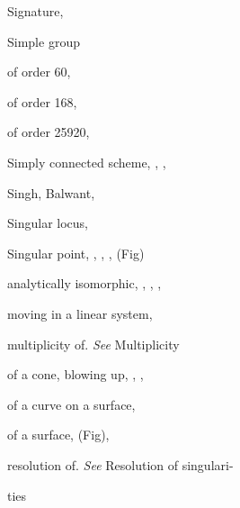 {{\noindent\hspace*{0.0bp}Signature, \par
\noindent\hspace*{0.0bp}Simple group\par
\noindent\hspace*{7.5bp}of order 60, \par
\noindent\hspace*{7.5bp}of order 168, \par
\noindent\hspace*{7.5bp}of order 25920, \par
\noindent\hspace*{0.0bp}Simply connected scheme, , , \par
\noindent\hspace*{0.0bp}Singh, Balwant, \par
\noindent\hspace*{0.0bp}Singular locus, \par
\noindent\hspace*{0.0bp}Singular point, , , ,  (Fig)\par
\noindent\hspace*{7.5bp}analytically isomorphic, , , , \par
\noindent\hspace*{7.5bp}moving in a linear system, \par
\noindent\hspace*{7.5bp}multiplicity of. \emph{See} Multiplicity\par
\noindent\hspace*{7.5bp}of a cone, blowing up, , , \par
\noindent\hspace*{7.5bp}of a curve on a surface, \par
\noindent\hspace*{7.5bp}of a surface,  (Fig), \par
\noindent\hspace*{7.5bp}resolution of. \emph{See} Resolution of singulari-\par
\noindent\hspace*{15.0bp}ties\par
}}

